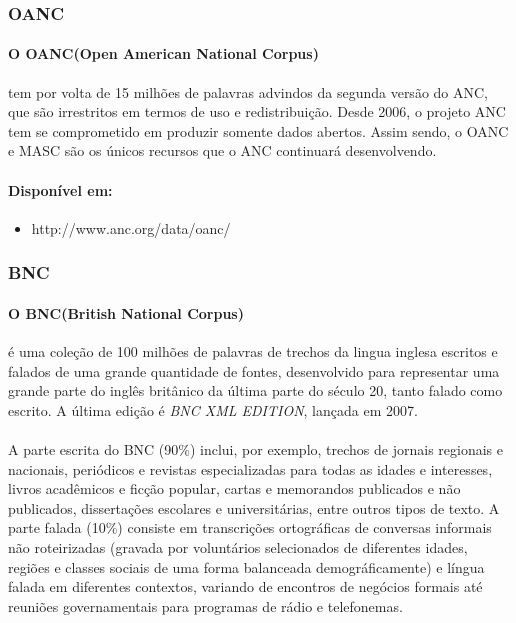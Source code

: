 \documentclass[a4paper, 10pt]{article}
\begin{document}
            \subsubsection{OANC}
            	\paragraph{O OANC(Open American National Corpus)}tem por volta de 15 milhões de palavras advindos da segunda versão do ANC, que são irrestritos em termos de uso e redistribuição. Desde 2006, o projeto ANC tem se comprometido em produzir somente dados abertos. Assim sendo, o OANC e MASC são os únicos recursos que o ANC continuará desenvolvendo.
            	
            	\paragraph{Disponível em:}
                \begin{itemize}
                    \item http://www.anc.org/data/oanc/
                \end{itemize}
            \subsubsection{BNC}
            	\paragraph{O BNC(British National Corpus)}é uma coleção de 100 milhões de palavras de trechos da lingua inglesa escritos e falados de uma grande quantidade de fontes, desenvolvido para representar uma grande parte do inglês britânico da última parte do século 20, tanto falado como escrito. A última edição é \textit{BNC XML EDITION}, lançada em 2007.
                \paragraph{}A parte escrita do BNC (90\%) inclui, por exemplo, trechos de jornais regionais e nacionais, periódicos e revistas especializadas para todas as idades e interesses, livros acadêmicos e ficção popular, cartas e memorandos publicados e não publicados, dissertações escolares e universitárias, entre outros tipos de texto. A parte falada (10\%) consiste em transcrições ortográficas de conversas informais não roteirizadas (gravada por voluntários selecionados de diferentes idades, regiões e classes sociais de uma forma balanceada demográficamente) e língua falada em diferentes contextos, variando de encontros de negócios formais até reuniões governamentais para programas de rádio e telefonemas.
\end{document}
